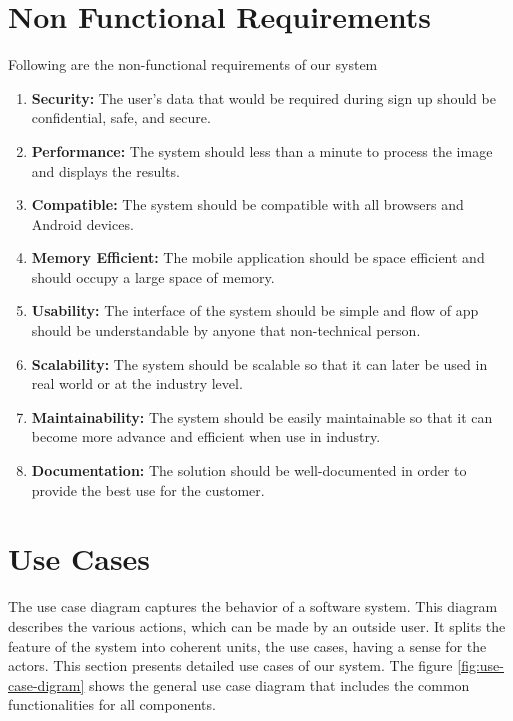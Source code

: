 \section{Non Functional Requirements}
Following are the non-functional requirements of our system
\begin{enumerate}
  \item \textbf{Security:} The user's data that would be required during sign up should be confidential, safe, and secure.
  \item \textbf{Performance:} The system should less than a minute to process the image and displays the results.
  \item \textbf{Compatible:} The system should be compatible with all browsers and Android devices.
  \item \textbf{Memory Efficient:} The mobile application should be space efficient and should occupy a large space of memory.
  \item \textbf{Usability:} The interface of the system should be simple and flow of app should be understandable by anyone that non-technical person.
  \item \textbf{Scalability:} The system should be scalable so that it can later be used in real world or at the industry level.
  \item \textbf{Maintainability:} The system should be easily maintainable so that it can become more advance and efficient when use in industry.
  \item \textbf{Documentation:} The solution should be well-documented in order to provide the best use for the customer.
\end{enumerate}

\clearpage

\section{Use Cases}
The use case diagram captures the behavior of a software system. This diagram describes the various actions, which can be made by an outside user. It splits the feature of the system into coherent units, the use cases, having a sense for the actors. This section presents detailed use cases of our system. The figure \ref{fig:use-case-digram} shows the general use case diagram that includes the common functionalities for all components. \\

